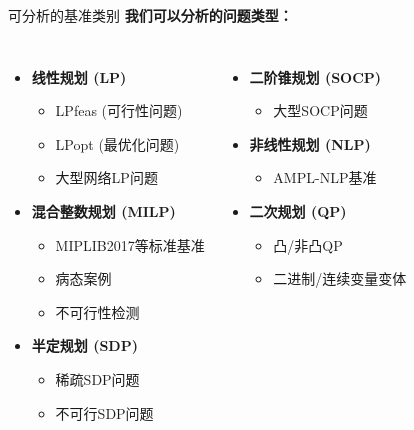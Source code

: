 \documentclass[10pt]{beamer}
\begin{document}
\begin{frame}{可分析的基准类别}
  \textbf{我们可以分析的问题类型：}
  \begin{columns}[T,onlytextwidth]
      \begin{itemize}
        \item \textbf{线性规划 (LP)}
        \begin{itemize}
          \item LPfeas (可行性问题)
          \item LPopt (最优化问题)
          \item 大型网络LP问题
        \end{itemize}
        \item \textbf{混合整数规划 (MILP)}
        \begin{itemize}
          \item MIPLIB2017等标准基准
          \item 病态案例
          \item 不可行性检测
        \end{itemize}
        \item \textbf{半定规划 (SDP)}
        \begin{itemize}
          \item 稀疏SDP问题
          \item 不可行SDP问题
        \end{itemize}
      \end{itemize}
      \begin{itemize}
        \item \textbf{二阶锥规划 (SOCP)}
        \begin{itemize}
          \item 大型SOCP问题
        \end{itemize}
        \item \textbf{非线性规划 (NLP)}
        \begin{itemize}
          \item AMPL-NLP基准
        \end{itemize}
        \item \textbf{二次规划 (QP)}
        \begin{itemize}
          \item 凸/非凸QP
          \item 二进制/连续变量变体
        \end{itemize}
      \end{itemize}
  \end{columns}
\end{frame}
\end{document}
